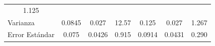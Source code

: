 \begin{table}[H]
\begin{tabular}{lccc|ccc}
\multicolumn{1}{c}{1.125} \\ Varianza                           & \multicolumn{1}{c}{0.0845}                                      & \multicolumn{1}{c}{0.027} & 12.57                               & \multicolumn{1}{c}{0.125}                                       & 
\multicolumn{1}{c}{0.027}                                       & 
\multicolumn{1}{c}{1.267}  \\ Error Estándar                    & \multicolumn{1}{c}{0.075}                                       & \multicolumn{1}{c}{0.0426} & 0.915                              & 
\multicolumn{1}{c}{0.0914}                                      & 
\multicolumn{1}{c}{0.0431}                                      & 
\multicolumn{1}{c|}{0.290}  \\ 
\hline
\end{tabular}
\end{table}

